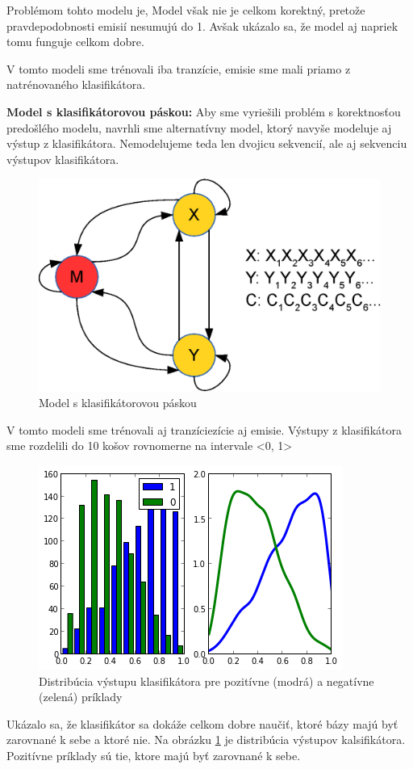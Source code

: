 \documentclass{svk_short_sk}
\begin{document}
Problémom tohto modelu je, Model však nie je celkom korektný, pretože pravdepodobnosti emisií nesumujú do 1. Avšak ukázalo sa, že model aj napriek tomu funguje celkom dobre.

V tomto modeli sme trénovali iba tranzície, emisie sme mali priamo z natrénovaného klasifikátora.

\textbf{Model s klasifikátorovou páskou:}
Aby sme vyriešili problém s korektnosťou predošlého modelu, navrhli sme alternatívny model, ktorý navyše modeluje aj výstup z klasifikátora.
Nemodelujeme teda len dvojicu sekvencií, ale aj sekvenciu výstupov klasifikátora.

\begin{figure}[htp]
    \centering
    \includegraphics[width=.3\textwidth]{images/model_clf_paska}
    \caption{Model s klasifikátorovou páskou}
\end{figure}

V tomto modeli sme trénovali aj tranzíciezície aj emisie. Výstupy z klasifikátora sme rozdelili do 10 košov rovnomerne na intervale <0, 1>

\begin{figure}[htp]
    \centering
    \includegraphics[width=.3\textwidth]{images/clf_m_test}
    \caption{Distribúcia výstupu klasifikátora pre pozitívne (modrá) a negatívne (zelená) príklady}
    \label{fig:clf-m-dist}
\end{figure}

Ukázalo sa, že klasifikátor sa dokáže celkom dobre naučiť, ktoré bázy majú byť zarovnané k sebe a ktoré nie. Na obrázku \ref{fig:clf-m-dist} je distribúcia výstupov kalsifikátora. Pozitívne príklady sú tie, ktore majú byť zarovnané k sebe.

\nocite{*}



\end{document}
